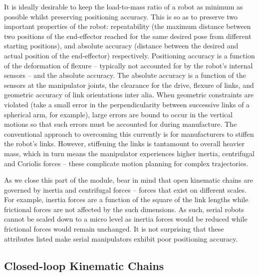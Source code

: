 It is ideally desirable to keep the load-to-mass ratio of a robot as minimum as possible whilst preserving positioning accuracy. This is so as to preserve two important properties of the robot: repeatability (\ie the maximum distance between two positions of the end-effector reached for the same desired pose from different starting positions),  and absolute accuracy (\ie distance between the desired and actual position of the end-effector) respectively. Positioning accuracy is a function of the deformation of flexure -- typically not accounted for by the robot's internal sensors -- and the absolute accuracy. The absolute accuracy is a function of the sensors at the manipulator joints, the clearance for the drive, flexure of links, and geometric accuracy of link orientations inter alia. When geometric constraints are violated (take a small error in the perpendicularity between successive links of a spherical arm, for example), large errors are bound to occur in the vertical motions so that such errors must be accounted for during manufacture. The conventional approach to overcoming this currently is for manufacturers to stiffen the robot's links. However, stiffening the links is tantamount to overall heavier mass, which in turn means the manipulator experiences higher inertia, centrifugal and Coriolis forces -- these complicate motion planning for complex trajectories.  

As we close this part of the module, bear in mind that open kinematic chains are governed by inertia and centrifugal forces -- forces that exist on different scales. For example, inertia forces are a function of the square of the link lengths while frictional forces are not affected by the such dimensions. As such, serial robots cannot be scaled down to a micro level as inertia forces would be reduced while frictional forces would remain unchanged. It is not surprising that these attributes listed make serial manipulators exhibit poor positioning accuracy. 

\subsection{Closed-loop Kinematic Chains}
 
